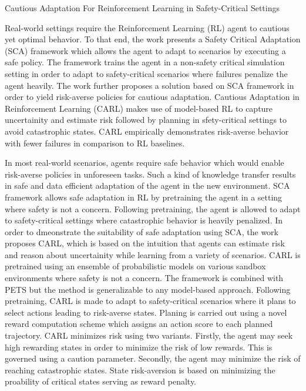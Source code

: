 \documentclass[11pt,letterpaper]{article}
\begin{document}
\begin{center}
  \large{Cautious Adaptation For Reinforcement Learning in Safety-Critical Settings}
\end{center}

Real-world settings require the Reinforcement Learning (RL) agent to cautious yet optimal behavior. To that end, the work presents a Safety Critical Adaptation (SCA) framework which allows the agent to adapt to scenarios by executing a safe policy. The framework trains the agent in a non-safety critical simulation setting in order to adapt to safety-critical scenarios where failures penalize the agent heavily. The work further proposes a solution based on SCA framework in order to yield risk-averse policies for cautious adaptation. Cautious Adaptation in Reinforcement Learning (CARL) makes use of model-based RL to capture uncertainity and estimate risk followed by planning in sfety-critical settings to avoid catastrophic states. CARL empirically demonstrates risk-averse behavior with fewer failures in comparison to RL baselines. 

In most real-world scenarios, agents require safe behavior which would enable risk-averse policies in unforeseen tasks. Such a kind of knowledge transfer results in safe and data efficient adaptation of the agent in the new environment. SCA framework allows safe adaptation in RL by pretraining the agent in a setting where safety is not a concern. Following pretraining, the agent is allowed to adapt to safety-critical settings where catastrophic behavior is heavily penalized. In order to dmeonstrate the suitability of safe adaptation using SCA, the work proposes CARL, which is based on the intuition that agents can estimate risk and reason about uncertainity while learning from a variety of scenarios. CARL is pretrained using an ensemble of probabilistic models on various sandbox environments where safety is not a concern. The framework is combined with PETS but the method is generalizable to any model-based approach. Following pretraining, CARL is made to adapt to safety-critical scenarios where it plans to select actions leading to risk-averse states. Planing is carried out using a novel reward computation scheme which assigns an action score to each planned trajectory. CARL minimizes risk using two variants. Firstly, the agent may seek high rewarding states in order to minimize the risk of low rewards. This is governed using a caution parameter. Secondly, the agent may minimize the risk of reaching catastrophic states. State risk-aversion is based on minimizing the proability of critical states serving as reward penalty. 
\end{document}
